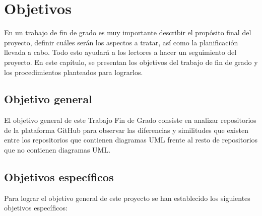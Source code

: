 \documentclass[a4paper, 12pt]{book}
\begin{document}

\cleardoublepage %
\chapter{Objetivos} %
\label{chap:objetivos} %

En un trabajo de fin de grado es muy importante describir el propósito final del proyecto, definir cuáles serán los aspectos a tratar, así como la planificación llevada a cabo.
Todo esto ayudará a los lectores a hacer un seguimiento del proyecto. 
En este capítulo, se presentan los objetivos del trabajo de fin de grado y los procedimientos planteados para lograrlos.


\section{Objetivo general} %
\label{sec:objetivo-general} %

El objetivo general de este Trabajo Fin de Grado consiste en analizar repositorios de la plataforma GitHub para observar las diferencias y similitudes que existen entre los repositorios que contienen diagramas UML frente al resto de repositorios que no contienen diagramas UML.

\section{Objetivos específicos}
\label{sec:objetivos-especificos}

Para lograr el objetivo general de este proyecto se han establecido los siguientes objetivos específicos:
\end{document}
